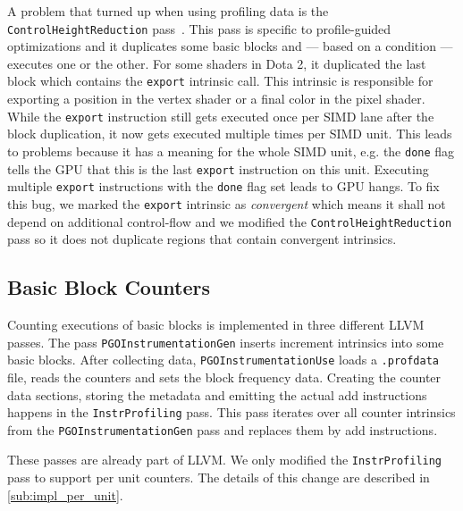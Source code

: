 A problem that turned up when using profiling data is the \texttt{ControlHeightReduction} pass~\cite{ControlHeightReduction}.
This pass is specific to profile-guided optimizations and it duplicates some basic blocks and --- based on a condition --- executes one or the other.
For some shaders in Dota 2, it duplicated the last block which contains the \texttt{export} intrinsic call.
This intrinsic is responsible for exporting a position in the vertex shader or a final color in the pixel shader.
While the \texttt{export} instruction still gets executed once per SIMD lane after the block duplication, it now gets executed multiple times per SIMD unit.
This leads to problems because it has a meaning for the whole SIMD unit, e.g. the \texttt{done} flag tells the GPU that this is the last \texttt{export} instruction on this unit.
Executing multiple \texttt{export} instructions with the \texttt{done} flag set leads to GPU hangs.
To fix this bug, we marked the \texttt{export} intrinsic as \emph{convergent} which means it shall not depend on additional control-flow and we modified the \texttt{ControlHeightReduction} pass so it does not duplicate regions that contain convergent intrinsics.

\subsection{Basic Block Counters}
\label{sub:bbcounters}
Counting executions of basic blocks is implemented in three different LLVM passes.
The pass \texttt{PGOInstrumentationGen} inserts increment intrinsics into some basic blocks.
After collecting data, \texttt{PGOInstrumentationUse} loads a \texttt{.profdata} file, reads the counters and sets the block frequency data.
Creating the counter data sections, storing the metadata and emitting the actual add instructions happens in the \texttt{InstrProfiling} pass.
This pass iterates over all counter intrinsics from the \texttt{PGOInstrumentationGen} pass and replaces them by add instructions.

These passes are already part of LLVM. We only modified the \texttt{InstrProfiling} pass to support per unit counters.
The details of this change are described in \cref{sub:impl_per_unit}.

